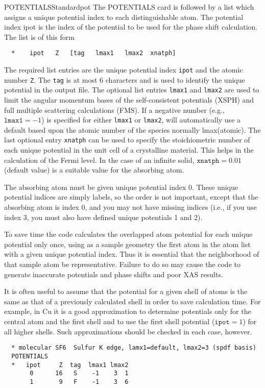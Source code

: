 \documentclass[11pt,oneside]{report} %
\begin{document}
\begin{Card}{POTENTIALS}{}{Standard}{pot}
  The POTENTIALS card is followed by a list which assigns a unique
  potential index to each distinguishable atom. The potential index
  ipot is the index of the potential to be used for the phase shift
  calculation.  The list is of this form
\begin{verbatim}
  *    ipot   Z   [tag   lmax1   lmax2  xnatph]
\end{verbatim}
  The required list entries are the unique potential index
  \texttt{ipot} and the atomic number \texttt{Z}.  The \texttt{tag} is
  at most 6 characters and is used to identify the unique potential in
  the  output file.  The optional list entries
  \texttt{lmax1} and \texttt{lmax2} are used to limit the angular
  momentum bases of the self-consistent potentials (XSPH) and full
  multiple scattering calculations (FMS).  If a negative number (e.g.,
  $\mathtt{lmax1}=-1$) is specified for either \texttt{lmax1} or
  \texttt{lmax2}, {\feff} will automatically use a default based upon the
  atomic number of the species normally lmax(atomic).  The last
  optional entry \texttt{xnatph} can be used to specify the
  stoichiometric number of each unique potential in the unit cell of a
  crystalline material.  This helps in the calculation of the Fermi
  level.  In the case of an infinite solid, $\mathtt{xnatph}=0.01$
  (default value) is a suitable value for the absorbing atom.

  The absorbing atom must be given unique potential index 0.  These
  unique potential indices are simply labels, so the order is not
  important, except that the absorbing atom is index 0, and you may not
  have missing indices (i.e., if you use index 3, you must also have
  defined unique potentials 1 and 2).

  To save time the code calculates the overlapped atom potential for
  each unique potential only once, using as a sample geometry the
  first atom in the atom list with a given unique potential index.
  Thus it is essential that the neighborhood of that sample atom be
  representative.  Failure to do so may cause the code to generate
  inaccurate potentials and phase shifts and poor XAS results.

  It is often useful to assume that the potential for a given shell of
  atoms is the same as that of a previously calculated shell in order
  to save calculation time. For example, in Cu it is a good
  approximation to determine potentials only for the central atom and
  the first shell and to use the first shell potential
  ($\mathtt{ipot}=1$) for all higher shells.  Such approximations should
  be checked in each case, however.
\begin{verbatim}
  * molecular SF6  Sulfur K edge, lamx1=default, lmax2=3 (spdf basis)
  POTENTIALS
  *   ipot     Z  tag  lmax1 lmax2
       0      16   S    -1    3  1
       1       9   F    -1    3  6
\end{verbatim}
\end{Card}
\end{document}
